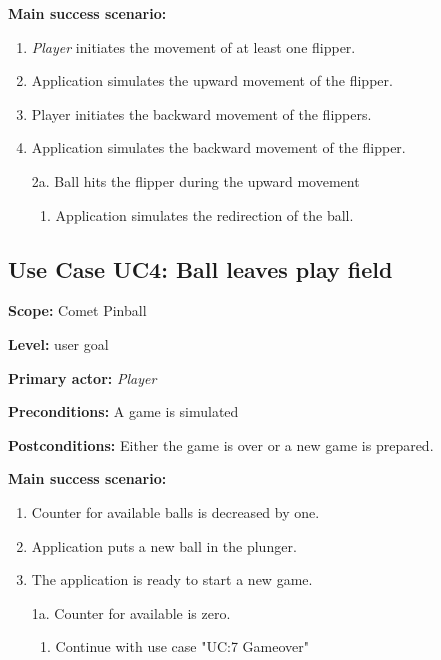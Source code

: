 \documentclass[fontsize=12pt,
               paper=a4,
               twoside=false,
               parskip=half,
               ]{scrartcl}
\begin{document}
\textbf{\textsf{Main success scenario:}}

\begin{enumerate}[leftmargin=3em]
	\item \emph{Player} initiates the movement of at least one flipper.
	\item Application simulates the upward movement of the flipper.
	\item Player initiates the backward movement of the flippers.
	\item Application simulates the backward movement of the flipper.
\end{enumerate}


\begin{itemize}[leftmargin=3em]
	\item[2a.] Ball hits the flipper during the upward movement
	\begin{enumerate}
		\item Application simulates the redirection of the ball.
	\end{enumerate}
\end{itemize}


\subsection{Use Case UC4: Ball leaves play field}

\textbf{\textsf{Scope:}} Comet Pinball

\textbf{\textsf{Level:}} user goal

\textbf{\textsf{Primary actor:}} \emph{Player}

\textbf{\textsf{Preconditions:}} A game is simulated

\textbf{\textsf{Postconditions:}} Either the game is over or a new game is prepared.

\textbf{\textsf{Main success scenario:}}

\begin{enumerate}[leftmargin=3em]
	\item Counter for available balls is decreased by one.
	\item Application puts a new ball in the plunger.
	\item The application is ready to start a new game.
\end{enumerate}


\begin{itemize}[leftmargin=3em]
	\item[1a.] Counter for available is zero.
	\begin{enumerate}
		\item Continue with use case "UC:7 Gameover"
	\end{enumerate}
\end{itemize}
\end{document}
